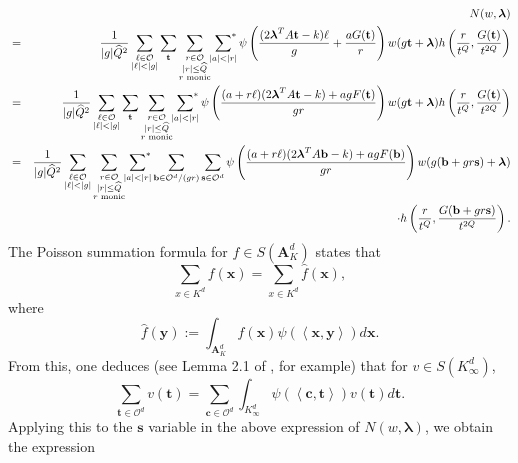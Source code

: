\documentclass[11pt]{amsart}
\theoremstyle{plain}
\theoremstyle{plain}
\renewcommand{\vec}[1]{\mathbf{#1}}
\theoremstyle{remark}
\theoremstyle{definition}
\renewcommand{\hat}{\widehat}
\newcommand{\Ki}{K_\infty}
\newcommand{\hQ}{\widehat{Q}}
\newcommand{\sumstar}{\sideset{}{^*}\sum}
\newcommand{\cO}{\mathcal{O}}
\begin{document}
\begin{eqnarray*}
&&N(w,\boldsymbol{\lambda})\\&=&
\frac{1}{|g|\hQ^2}\sum_{\substack{\ell\in \cO\\ |\ell|<|g|}}\sum_{\vec{t}}
\sum_{\substack{
r\in \cO\\
|r|\leq \hat Q\\
\text{$r$ monic}
} }
\sumstar_{\substack{
|a|<|r|} }\psi\left(\frac{(2\boldsymbol{\lambda}^T A\vec{t}-k)\ell}{g}+\frac{aG(\vec{t})}{r}\right)w(g\vec{t}+\boldsymbol{\lambda})h\left(\frac{r}{t^Q},\frac{G(\vec{t})}{t^{2Q}}\right)\\ &=& \frac{1}{|g|\hQ^2}\sum_{\substack{\ell\in \cO\\ |\ell|<|g|}}\sum_{\vec{t}}
\sum_{\substack{
r\in \cO\\
|r|\leq \hat Q\\
\text{$r$ monic}
} }
\sumstar_{\substack{
|a|<|r|} }\psi\left(\frac{(a+r\ell)(2\boldsymbol{\lambda}^T A\vec{t}-k)+agF(\vec{t})}{gr}\right)w(g\vec{t}+\boldsymbol{\lambda})h\left(\frac{r}{t^Q},\frac{G(\vec{t})}{t^{2Q}}\right)\\&=&\frac{1}{|g|\hQ^2}\sum_{\substack{\ell\in \cO\\ |\ell|<|g|}}
\sum_{\substack{
r\in \cO\\
|r|\leq \hat Q\\
\text{$r$ monic}
} }
\sumstar_{\substack{
|a|<|r|} }\sum_{\vec{b}\in\mathcal{O}^d/(gr)}\sum_{\vec{s}\in\mathcal{O}^d}\psi\left(\frac{(a+r\ell)(2\boldsymbol{\lambda}^T A\vec{b}-k)+agF(\vec{b})}{gr}\right)w(g(\vec{b}+gr\vec{s})+\boldsymbol{\lambda})\\&&\cdot h\left(\frac{r}{t^Q},\frac{G(\vec{b}+gr\vec{s})}{t^{2Q}}\right).
\end{eqnarray*}
The Poisson summation formula for $f\in S(\mathbf{A}^d_K)$ states that
\[\sum_{x\in K^d}f(\vec{x})=\sum_{x\in K^d}\hat{f}(\vec{x}),\]
where
\[\hat{f}(\vec{y}):=\int_{\mathbf{A}_K^d}f(\vec{x})\psi(\left<\vec{x},\vec{y}\right>)d\vec{x}.\]
From this, one deduces (see Lemma 2.1 of \cite{Browning}, for example) that for $v\in S(\Ki^d)$,
\[\sum_{\vec{t}\in\mathcal{O}^d}v(\vec{t})=\sum_{\vec{c}\in\mathcal{O}^d}\int_{\Ki^d}\psi(\left<\vec{c},\vec{t}\right>)v(\vec{t})d\vec{t}.\]
Applying this to the $\vec{s}$ variable in the above expression of $N(w,\boldsymbol{\lambda})$, we obtain the expression
\end{document}
